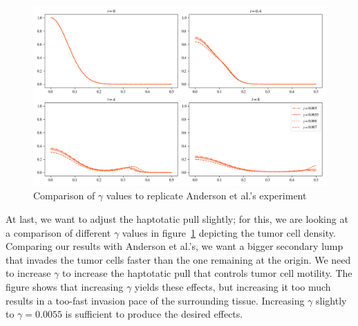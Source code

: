 \begin{figure}[!htb]
 \centering
 \includegraphics[width=\textwidth]{resources/images/gamma_comparison.png}
 \caption{Comparison of $\gamma$ values to replicate Anderson et al.'s experiment}
 \label{fig:replication_gamma_comparison}
\end{figure}
At last, we want to adjust the haptotatic pull slightly; for this, we are looking at a comparison of different $\gamma$ values in figure~\ref{fig:replication_gamma_comparison} depicting the tumor cell density. Comparing our results with Anderson et al.'s, we want a bigger secondary lump that invades the tumor cells faster than the one remaining at the origin. We need to increase $\gamma$ to increase the haptotatic pull that controls tumor cell motility. The figure shows that increasing $\gamma$ yields these effects, but increasing it too much results in a too-fast invasion pace of the surrounding tissue. Increasing $\gamma$ slightly to $\gamma=0.0055$ is sufficient to produce the desired effects.

